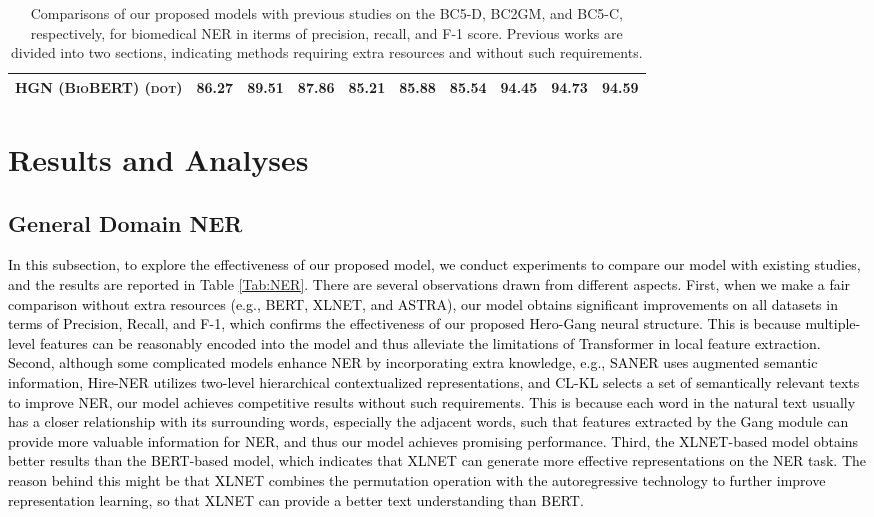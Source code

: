 \documentclass[11pt]{article}
\begin{document}
\begin{table*}[t]
\begin{tabular}{lccccccccc}
\textsc{HGN (BioBERT) (dot)} & {86.27} & {89.51}   & \textbf{87.86} & 
{85.21} & {85.88} & {85.54} & 
{94.45} & {94.73} & \textbf{94.59} \\
\bottomrule
 \end{tabular}
   \caption{Comparisons of our proposed models with previous studies on the BC5-D, BC2GM, and BC5-C, respectively, for biomedical NER in iterms of precision, recall, and F-1 score. 
  Previous works are divided into two sections, indicating methods requiring extra resources and without such requirements.
   }\label{Tab:BIO}
\vspace{-2mm}
\end{table*} 

\section{Results and Analyses}

\subsection{General Domain NER}
\textcolor{black}{
In this subsection, to explore the effectiveness of our proposed model, we conduct experiments to compare our model with existing studies, and the results are reported in Table \ref{Tab:NER}.
There are several observations drawn from different aspects.
First, when we make a fair comparison without extra resources (e.g., BERT, XLNET, and ASTRA), our model obtains significant improvements on all datasets in terms of Precision, Recall, and F-1, which confirms the effectiveness of our proposed Hero-Gang neural structure. This is because multiple-level features can be reasonably encoded into the model and thus alleviate the limitations of Transformer in local feature extraction.
Second, although some complicated models enhance NER by incorporating extra knowledge, e.g., SANER uses augmented semantic information, Hire-NER utilizes two-level hierarchical contextualized representations, and CL-KL selects a set of semantically relevant texts to improve NER, our model achieves competitive results without such requirements.
This is because each word in the natural text usually has a closer relationship with its surrounding words, especially the adjacent words, such that features extracted by the Gang module can provide more valuable information for NER, and thus our model achieves promising performance.
Third, the XLNET-based model obtains better results than the BERT-based model, which indicates that XLNET can generate more effective representations on the NER task. The reason behind this might be that XLNET combines the permutation operation with the autoregressive technology to further improve representation learning, so that XLNET can provide a better text understanding than BERT.
}
\end{document}
